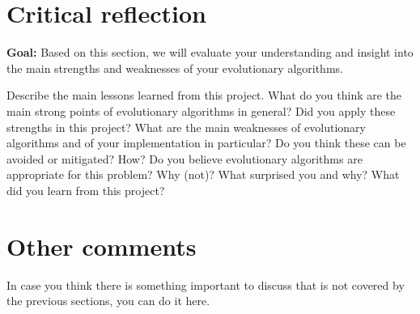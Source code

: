 \documentclass[a4paper,10pt]{article}
\newcommand{\ReplaceMe}[1]{{\color{blue}#1}}
\newcommand{\RemoveMe}[1]{{\color{purple}#1}}
\begin{document}
\section{Critical reflection}

\RemoveMe{\textbf{Goal:} Based on this section, we will evaluate your understanding and insight into the main strengths and weaknesses of your evolutionary algorithms.}

\ReplaceMe{Describe the main lessons learned from this project. What do you think are the main strong points of evolutionary algorithms in general? Did you apply these strengths in this project? What are the main weaknesses of evolutionary algorithms and of your implementation in particular? Do you think these can be avoided or mitigated? How? Do you believe evolutionary algorithms are appropriate for this problem? Why (not)? What surprised you and why? What did you learn from this project?}

\section{Other comments} \label{sec_other}

\ReplaceMe{In case you think there is something important to discuss that is not covered by the previous sections, you can do it here. }
\end{document}
